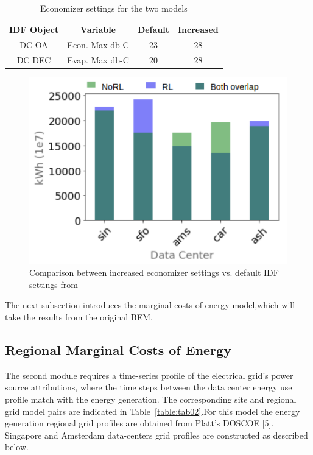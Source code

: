  
  \begin{table}[ht]
  \begin{small}
    \vspace{-10 pt}
    \caption{Economizer settings for the two models}
    \label{table:tab01}
    \centering
    \begin{tabular}{| c | c | c |c| }
      \hline
      IDF Object & Variable & Default & Increased\\
      \hline  \hline
      DC-OA & Econ. Max db-C & 23 & 28 \\
      \hline
      DC DEC & Evap. Max db-C & 20 & 28 \\
      \hline
    \end{tabular}
    \vspace{-8 pt}   %
    \end{small}
    \end{table}

  \begin{figure}
    \centering
    \includegraphics[scale=.3]{marginal_energy_cost/img/total_energy_comp2.png}
    \caption[Comparison of Economizer Settings in E+]{Comparison between increased economizer settings  vs. default IDF settings from \cite{kumar20} }
    \label{fig:total_energy_comp}
    \end{figure}

  The next subsection introduces the marginal costs of energy model,which will take the results from the original BEM.

\subsection{Regional Marginal Costs of Energy}
The second module requires a time-series profile of the electrical grid’s power source attributions, where the time steps between the data center energy use profile match with the energy generation.  The corresponding  site and regional grid model pairs are indicated in Table~\ref{table:tab02}.For this model the energy generation regional grid profiles are obtained from Platt’s DOSCOE [5]. Singapore and Amsterdam data-centers grid profiles are constructed as described below.

